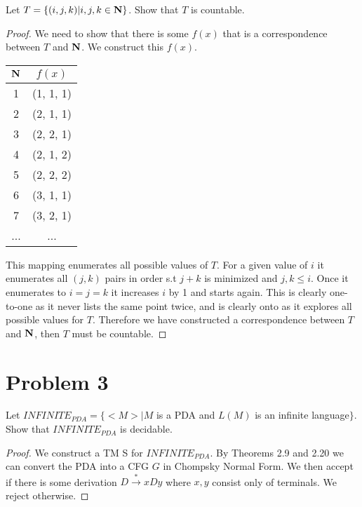 \documentclass[11pt]{article}
\begin{document}
Let $T=\{(i,j,k)|i,j,k\in{\mathbf{N}}\}$. Show that $T$ is countable.


\begin{proof}


We need to show that there is some $f(x)$ that is a correspondence between $T$ and $\mathbf{N}$.  We construct this $f(x)$. 

\begin{table}[H]
\centering
	\begin{tabular}{c | c}
	$\mathbf{N}$ & $f(x)$\\ \hline
	1 & (1, 1, 1)\\
	2 & (2, 1, 1)\\
	3 & (2, 2, 1)\\
	4 & (2, 1, 2)\\
	5 & (2, 2, 2)\\
	6 & (3, 1, 1)\\
	7 & (3, 2, 1)\\
	... & ...
	\end{tabular}
\end{table}

This mapping enumerates all possible values of $T$. For a given value of $i$ it enumerates all $(j, k)$ pairs in order s.t $j+k$ is minimized and $j, k \leq i$. Once it enumerates to $i = j = k$ it increases $i$ by 1 and starts again. This is clearly one-to-one as it never lists the same point twice, and is clearly onto as it explores all possible values for $T$. Therefore we have constructed a correspondence between $T$ and $\mathbf{N}$, then $T$ must be countable.

\end{proof}


\newpage
\section*{Problem 3}

Let $INFINITE_{PDA}=\{<M>|M$ is a PDA and $L(M)$ is an infinite language$\}$.
Show that $INFINITE_{PDA}$ is decidable.
\newline




\begin{proof}

We construct a TM S for $INFINITE_{PDA}$. By Theorems 2.9 and 2.20 we can convert the PDA into a CFG $G$ in Chompsky Normal Form. We then accept if there is some derivation $D \xrightarrow{*} xDy$ where $x,y$ consist only of terminals. We reject otherwise.

\end{proof}
\end{document}
